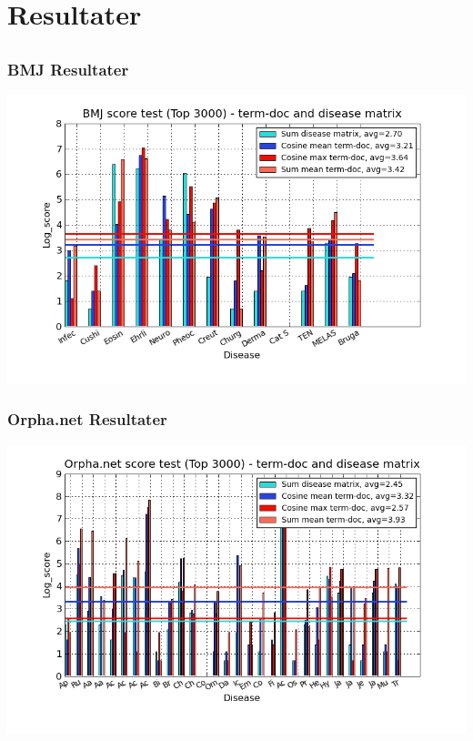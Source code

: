 \documentclass[xcolor=table]{beamer}
\begin{document}
\section{Resultater}

\subsection*{}

\begin{frame}

  \frametitle{BMJ Resultater}

  \begin{center}
    \includegraphics[width=1.0\textwidth]{diagram/termDoc_bmj_hist_3000_sum_dm_mea_cos_sqrt_td_max_cos_sqrt_td_mea_sum_td}
  \end{center}

\end{frame}

\begin{frame}

  \frametitle{Orpha.net Resultater}

  \begin{center}
    \includegraphics[width=1.0\textwidth]{diagram/termDoc_orphan_hist_3000_sum_dm_mea_cos_sqrt_td_max_cos_sqrt_td_mea_sum_nn_td}
  \end{center}

\end{frame}
\end{document}

